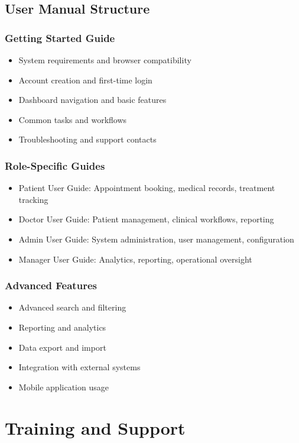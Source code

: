 \documentclass[12pt,a4paper]{article}
\begin{document}
\subsection{User Manual Structure}

\subsubsection{Getting Started Guide}
\begin{itemize}
    \item System requirements and browser compatibility
    \item Account creation and first-time login
    \item Dashboard navigation and basic features
    \item Common tasks and workflows
    \item Troubleshooting and support contacts
\end{itemize}

\subsubsection{Role-Specific Guides}
\begin{itemize}
    \item Patient User Guide: Appointment booking, medical records, treatment tracking
    \item Doctor User Guide: Patient management, clinical workflows, reporting
    \item Admin User Guide: System administration, user management, configuration
    \item Manager User Guide: Analytics, reporting, operational oversight
\end{itemize}

\subsubsection{Advanced Features}
\begin{itemize}
    \item Advanced search and filtering
    \item Reporting and analytics
    \item Data export and import
    \item Integration with external systems
    \item Mobile application usage
\end{itemize}

\section{Training and Support}
\end{document}

